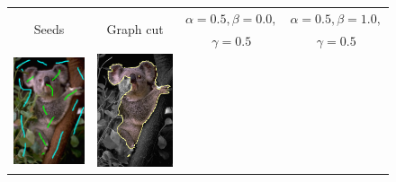 \begin{figure}
\center
\begin{tabular}{cccc}
\multirow{2}{*}{Seeds} & \multirow{2}{*}{Graph cut} & $\alpha=0.5, \beta=0.0,$ & $\alpha=0.5, \beta=1.0,$ \\
& & $\gamma=0.5$ & $\gamma=0.5$\\
 	\includegraphics[scale=0.25]{figures/chapter6/segmentation/coala/mt_improve/radius_5/data_0.50/sq_0.00/length_0.50/it_50/seeds.png} & 
 	\includegraphics[scale=0.25]{figures/chapter6/segmentation/coala/mt_improve/radius_5/data_0.50/sq_0.00/length_0.50/it_50/gc-seg.png} & 

\end{tabular}
\end{figure}
